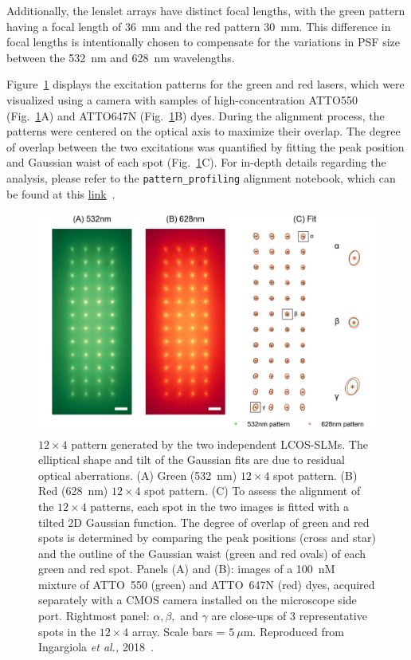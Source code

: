 Additionally, the lenslet arrays have distinct focal lengths, with the green pattern having a focal length of 36~mm and the red pattern 30~mm. 
This difference in focal lengths is intentionally chosen to compensate for the variations in \ac{PSF} size between the 532~nm and 628~nm wavelengths.

Figure~\ref{fig:pattern_profile} displays the excitation patterns for the green and red lasers, which were visualized using a camera with samples of high-concentration ATTO550 (Fig.~\ref{fig:pattern_profile}A) and ATTO647N (Fig.~\ref{fig:pattern_profile}B) dyes. 
During the alignment process, the patterns were centered on the optical axis to maximize their overlap.
The degree of overlap between the two excitations was quantified by fitting the peak position and Gaussian waist of each spot (Fig.~\ref{fig:pattern_profile}C). 
For in-depth details regarding the analysis, please refer to the \texttt{pattern\_profiling} alignment notebook, which can be found at this \href{https://github.com/tritemio/48-spot-smFRET-PAX-analysis/tree/master/alignment}{link}~\cite{ingargiola_JCP_2018}.

\begin{figure}
\centering
\includegraphics[width=1.0\linewidth]{chapters/figures/2017-04-28_conf9_G_conf14_R_green_red_pattern_and_fit.png}
\caption{\label{fig:pattern_profile} $12\times4$ pattern generated by the two independent \ac{LCOS-SLM}s. 
The elliptical shape and tilt of the Gaussian fits are due to residual optical aberrations. 
(A) Green (532~nm) $12\times4$ spot pattern. 
(B) Red (628~nm) $12\times4$ spot pattern. 
(C) To assess the alignment of the $12\times4$ patterns, each spot in the two images is fitted  with a tilted 2D Gaussian function. 
The degree of overlap of green and red spots is determined by comparing the peak positions (cross and star) and the outline of the Gaussian waist (green and red ovals) of each green and red spot. 
Panels (A) and (B): images of a 100~nM mixture of ATTO~550 (green) and ATTO~647N (red) dyes, acquired separately with a CMOS camera installed on the microscope side port. 
Rightmost panel: $\alpha, \beta,$ and $\gamma$ are close-ups of 3 representative spots in the $12\times4$ array. 
Scale bars = $5~\mu$m. 
Reproduced from Ingargiola \textit{et al.,} 2018~\cite{ingargiola_JCP_2018}.
}
\end{figure}


